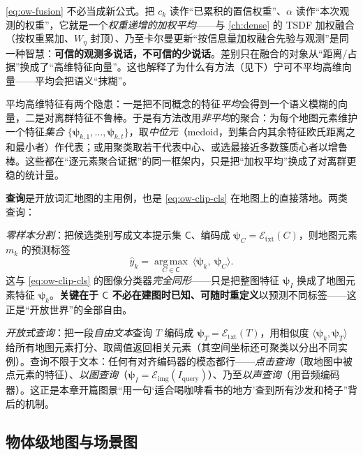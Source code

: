 \begin{insight}
\cref{eq:ow-fusion} 不必当成新公式。把 $c_k$ 读作“已累积的置信权重”、$\alpha$ 读作“本次观测的权重”，它就是一个\emph{权重递增的加权平均}——与 \cref{ch:dense} 的 TSDF 加权融合（按权重累加、$W_\eta$ 封顶）、乃至卡尔曼更新“按信息量加权融合先验与观测”是同一种智慧：\textbf{可信的观测多说话，不可信的少说话}。差别只在融合的对象从“距离/占据”换成了“高维特征向量”。这也解释了为什么有方法（见下）宁可不平均高维向量——平均会把语义“抹糊”。
\end{insight}

平均高维特征有两个隐患：一是把不同概念的特征\emph{平均}会得到一个语义模糊的向量，二是对离群特征不鲁棒。于是有方法改用\emph{非平均}的聚合：为每个地图元素维护一个特征\emph{集合} $\{\boldsymbol\psi_{k,1},\dots,\boldsymbol\psi_{k,t}\}$，取\emph{中位元}（medoid，到集合内其余特征欧氏距离之和最小者）作代表；或用聚类取若干代表中心、或选最接近多数簇质心者以增鲁棒\cite{paull2026openworld}。这些都在“逐元素聚合证据”的同一框架内，只是把“加权平均”换成了对离群更稳的统计量。

\textbf{查询}是开放词汇地图的主用例，也是 \cref{eq:ow-clip-cls} 在地图上的直接落地。两类查询：

\emph{零样本分割}：把候选类别写成文本提示集 $\mathsf{C}$、编码成 $\boldsymbol\psi_C=\mathcal{E}_{\mathrm{txt}}(C)$，则地图元素 $m_k$ 的预测标签
\begin{equation}
  \hat{y}_k=\operatorname*{arg\,max}_{C\in\mathsf{C}}\ \langle\boldsymbol\psi_k,\ \boldsymbol\psi_C\rangle.
  \label{eq:ow-query}
\end{equation}
这与 \cref{eq:ow-clip-cls} 的图像分类器\emph{完全同形}——只是把整图特征 $\boldsymbol\psi_I$ 换成了地图元素特征 $\boldsymbol\psi_k$。\textbf{关键在于 $\mathsf{C}$ 不必在建图时已知、可随时重定义}以预测不同标签——这正是“开放世界”的全部自由。

\emph{开放式查询}：把一段\emph{自由文本}查询 $T$ 编码成 $\boldsymbol\psi_T=\mathcal{E}_{\mathrm{txt}}(T)$，用相似度 $\langle\boldsymbol\psi_k,\boldsymbol\psi_T\rangle$ 给所有地图元素打分、取阈值返回相关元素（其空间坐标还可聚类以分出不同实例）。查询不限于文本：任何有对齐编码器的模态都行——\emph{点击查询}（取地图中被点元素的特征）、\emph{以图查询}（$\boldsymbol\psi_{I}=\mathcal{E}_{\mathrm{img}}(I_{\mathrm{query}})$）、乃至\emph{以声查询}（用音频编码器）。这正是本章开篇图景“用一句‘适合喝咖啡看书的地方’查到所有沙发和椅子”背后的机制。

\subsection{物体级地图与场景图}
\label{sec:openworld-objgraph}

